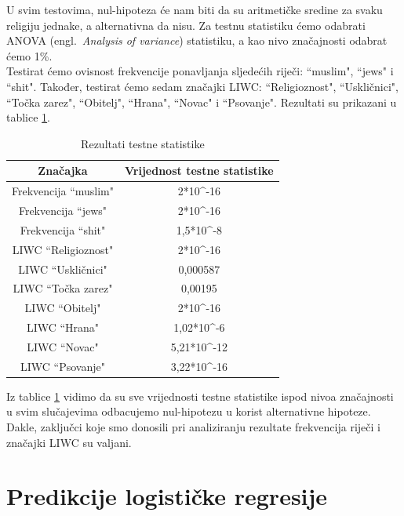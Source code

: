 \documentclass[times,utf8,zavrsni]{fer}
\begin{document}
U svim testovima, nul-hipoteza će nam biti da su aritmetičke sredine za svaku religiju jednake, a alternativna da nisu. Za testnu statistiku ćemo odabrati ANOVA (engl.~\emph{Analysis of variance}) statistiku, a kao nivo značajnosti odabrat ćemo 1\%. \\

Testirat ćemo ovisnost frekvencije ponavljanja sljedećih riječi: ``muslim", ``jews" i ``shit". Također, testirat ćemo sedam značajki LIWC: ``Religioznost", ``Uskličnici", ``Točka zarez", ``Obitelj", ``Hrana", ``Novac" i ``Psovanje". Rezultati su prikazani u tablice \ref{table:inf}. \\


\begin{table}[h!]
\centering
\caption{Rezultati testne statistike}
\label{table:inf}
\begin{tabular}{@{}cc@{}}
\hline
Značajka             & Vrijednost testne statistike   \\ 
\hline
\hline
Frekvencija ``muslim" & 2*10\textasciicircum{}-16    \\
Frekvencija ``jews"   & 2*10\textasciicircum{}-16    \\
Frekvencija ``shit"   & 1,5*10\textasciicircum{}-8   \\
LIWC ``Religioznost"  & 2*10\textasciicircum{}-16    \\
LIWC ``Uskličnici"    & 0,000587                     \\
LIWC ``Točka zarez"   & 0,00195                      \\
LIWC ``Obitelj"       & 2*10\textasciicircum{}-16    \\
LIWC ``Hrana"         & 1,02*10\textasciicircum{}-6  \\ 
LIWC ``Novac"         & 5,21*10\textasciicircum{}-12 \\
LIWC ``Psovanje"      & 3,22*10\textasciicircum{}-16 \\ 
\hline
\end{tabular}
\end{table}


Iz tablice \ref{table:inf} vidimo da su sve vrijednosti testne statistike ispod nivoa značajnosti u svim slučajevima odbacujemo nul-hipotezu u korist alternativne hipoteze. Dakle, zaključci koje smo donosili pri analiziranju rezultate frekvencija riječi i značajki LIWC su valjani. \\



\newpage
\section{Predikcije logističke regresije}
\end{document}
